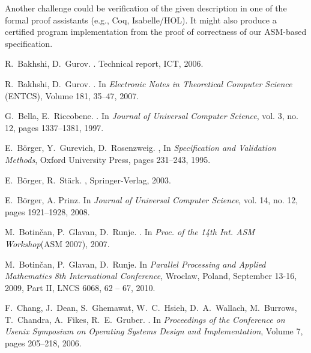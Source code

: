 \documentclass{amsart}
\theoremstyle{definition}
\begin{document}
Another challenge could be verification of the given description in one of the formal proof assistants (e.g., Coq, Isabelle/HOL). It
might also produce a certified program implementation from the proof of correctness of our ASM-based specification.




\begin{thebibliography}{}

R.~Bakhshi, D.~Gurov.
.
\newblock Technical report, ICT, 2006.

R.~Bakhshi, D.~Gurov.
.
\newblock In {\em Electronic Notes in Theoretical Computer Science} (ENTCS), Volume 181, 35--47, 2007.

 G.~Bella, E.~Riccobene.
.
\newblock In {\em Journal of Universal Computer Science}, vol. 3, no. 12, pages 1337--1381, 1997.

 E.~B\"{o}rger, Y.~Gurevich, D.~Rosenzweig.
,
\newblock In {\em Specification and Validation Methods}, Oxford University Press, pages 231--243, 1995.

E.~B\"{o}rger, R.~St\"{a}rk.
,
\newblock Springer-Verlag, 2003.

E.~B\"{o}rger, A. Prinz.
\newblock In {\em Journal of Universal Computer Science}, vol. 14, no. 12, pages 1921--1928, 2008.

 M.~Botin\v{c}an, P.~Glavan, D.~Runje.
.
\newblock In {\em Proc. of the 14th Int. ASM Workshop}(ASM 2007), 2007.

 M.~Botin\v{c}an, P.~Glavan, D.~Runje.
\newblock In {\em Parallel Processing and Applied Mathematics 8th International Conference}, Wroclaw,
Poland, September 13-16, 2009, Part II, LNCS 6068, 62 -- 67, 2010.

F.~Chang, J.~Dean, S.~Ghemawat, W.~C.~Hsieh, D.~A.~Wallach, M.~Burrows, T.~Chandra, A.~Fikes, R.~E.~Gruber.
.
\newblock In {\em Proceedings of the  Conference on Usenix Symposium on Operating Systems Design and Implementation},
Volume 7, pages 205--218, 2006.


\end{thebibliography}
\end{document}
